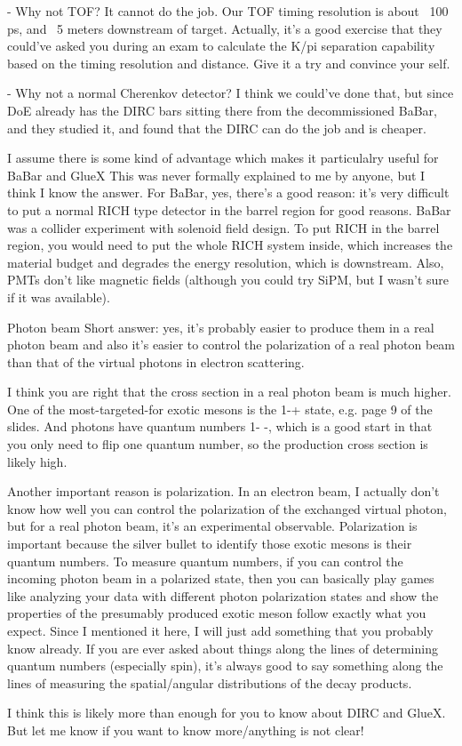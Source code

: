     - Why not TOF?
    It cannot do the job. Our TOF timing resolution is about ~100 ps, and ~5 meters downstream of target. Actually, it’s a good exercise that they could’ve asked you during an exam to calculate the K/pi separation capability based on the timing resolution and distance. Give it a try and convince your self.
    
    - Why not a normal Cherenkov detector?
    I think we could’ve done that, but since DoE already has the DIRC bars sitting there from the decommissioned BaBar, and they studied it, and found that the DIRC can do the job and is cheaper.
    
    I assume there is some kind of advantage which makes it particulalry useful for BaBar and GlueX
    This was never formally explained to me by anyone, but I think I know the answer. For BaBar, yes, there’s a good reason: it’s very difficult to put a normal RICH type detector in the barrel region for good reasons. BaBar was a collider experiment with solenoid field design. To put RICH in the barrel region, you would need to put the whole RICH system inside, which increases the material budget and degrades the energy resolution, which is downstream. Also, PMTs don’t like magnetic fields (although you could try SiPM, but I wasn’t sure if it was available).
    
    Photon beam
    Short answer: yes, it’s probably easier to produce them in a real photon beam and also it’s easier to control the polarization of a real photon beam than that of the virtual photons in electron scattering.
    
    I think you are right that the cross section in a real photon beam is much higher. One of the most-targeted-for exotic mesons is the 1-+ state, e.g. page 9 of the slides. And photons have quantum numbers 1- -, which is a good start in that you only need to flip one quantum number, so the production cross section is likely high.
    
    Another important reason is polarization. In an electron beam, I actually don’t know how well you can control the polarization of the exchanged virtual photon, but for a real photon beam, it’s an experimental observable. Polarization is important because the silver bullet to identify those exotic mesons is their quantum numbers. To measure quantum numbers, if you can control the incoming photon beam in a polarized state, then you can basically play games like analyzing your data with different photon polarization states and show the properties of the presumably produced exotic meson follow exactly what you expect. Since I mentioned it here, I will just add something that you probably know already. If you are ever asked about things along the lines of determining quantum numbers (especially spin), it’s always good to say something along the lines of measuring the spatial/angular distributions of the decay products.
    
    I think this is likely more than enough for you to know about DIRC and GlueX. But let me know if you want to know more/anything is not clear!
    
\fi
